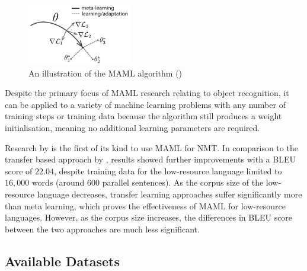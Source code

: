 \begin{figure}[ht!]
\centering
\includegraphics[width=0.40\textwidth]{media/literature/nmt_approaches/maml.png}
\caption[Diagram of a \gls{MAML} algorithm]{An illustration of the \Gls{MAML} algorithm (\cite{finn_model-agnostic_2017})}
\label{fig:MAML}
\end{figure}

Despite the primary focus of \acrshort{MAML} research relating to object recognition, it can be applied to a variety of machine learning problems with any number of training steps or training data because the algorithm still produces a weight initialisation, meaning no additional learning parameters are required.



%
%

Research by \cite{gu_meta-learning_2018} is the first of its kind to use \acrshort{MAML} for \acrshort{NMT}. In comparison to the transfer based approach by \cite{zoph_transfer_2016}, results showed further improvements with a BLEU score of $22.04$, despite training data for the low-resource language limited to $16,000$ words (around $600$ parallel sentences). As the corpus size of the low-resource language decreases, transfer learning approaches suffer significantly more than meta learning, which proves the effectiveness of \acrshort{MAML} for low-resource languages. However, as the corpus size increases, the differences in BLEU score between the two approaches are much less significant.

\subsection{Available Datasets}

